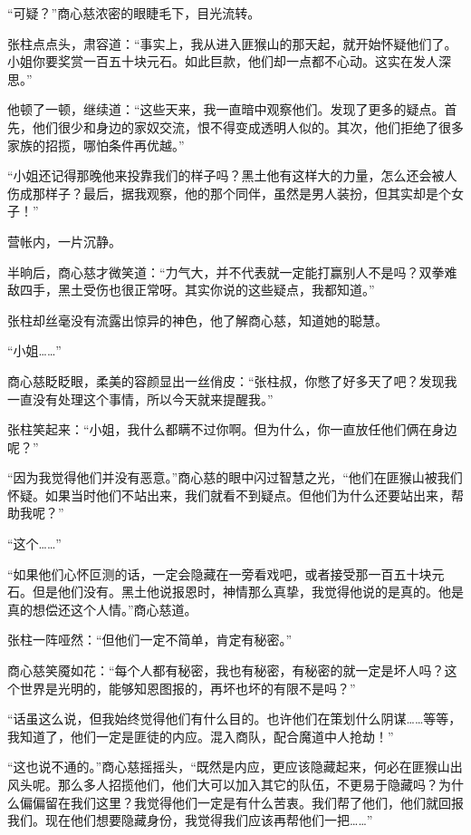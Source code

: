 
\begin{this_body}

“可疑？”商心慈浓密的眼睫毛下，目光流转。

张柱点点头，肃容道：“事实上，我从进入匪猴山的那天起，就开始怀疑他们了。小姐你要奖赏一百五十块元石。如此巨款，他们却一点都不心动。这实在发人深思。”

他顿了一顿，继续道：“这些天来，我一直暗中观察他们。发现了更多的疑点。首先，他们很少和身边的家奴交流，恨不得变成透明人似的。其次，他们拒绝了很多家族的招揽，哪怕条件再优越。”

“小姐还记得那晚他来投靠我们的样子吗？黑土他有这样大的力量，怎么还会被人伤成那样子？最后，据我观察，他的那个同伴，虽然是男人装扮，但其实却是个女子！”

营帐内，一片沉静。

半晌后，商心慈才微笑道：“力气大，并不代表就一定能打赢别人不是吗？双拳难敌四手，黑土受伤也很正常呀。其实你说的这些疑点，我都知道。”

张柱却丝毫没有流露出惊异的神色，他了解商心慈，知道她的聪慧。

“小姐……”

商心慈眨眨眼，柔美的容颜显出一丝俏皮：“张柱叔，你憋了好多天了吧？发现我一直没有处理这个事情，所以今天就来提醒我。”

张柱笑起来：“小姐，我什么都瞒不过你啊。但为什么，你一直放任他们俩在身边呢？”

“因为我觉得他们并没有恶意。”商心慈的眼中闪过智慧之光，“他们在匪猴山被我们怀疑。如果当时他们不站出来，我们就看不到疑点。但他们为什么还要站出来，帮助我呢？”

“这个……”

“如果他们心怀叵测的话，一定会隐藏在一旁看戏吧，或者接受那一百五十块元石。但是他们没有。黑土他说报恩时，神情那么真挚，我觉得他说的是真的。他是真的想偿还这个人情。”商心慈道。

张柱一阵哑然：“但他们一定不简单，肯定有秘密。”

商心慈笑魇如花：“每个人都有秘密，我也有秘密，有秘密的就一定是坏人吗？这个世界是光明的，能够知恩图报的，再坏也坏的有限不是吗？”

“话虽这么说，但我始终觉得他们有什么目的。也许他们在策划什么阴谋……等等，我知道了，他们一定是匪徒的内应。混入商队，配合魔道中人抢劫！”

“这也说不通的。”商心慈摇摇头，“既然是内应，更应该隐藏起来，何必在匪猴山出风头呢。那么多人招揽他们，他们大可以加入其它的队伍，不更易于隐藏吗？为什么偏偏留在我们这里？我觉得他们一定是有什么苦衷。我们帮了他们，他们就回报我们。现在他们想要隐藏身份，我觉得我们应该再帮他们一把……”


\end{this_body}
